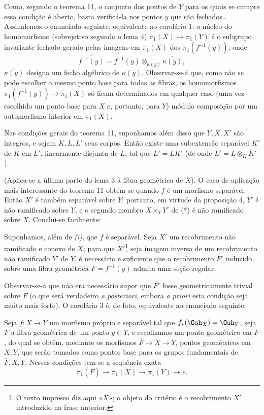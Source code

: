 Como, segundo o teorema 11, o conjunto dos pontos de $Y$ para os quais se
cumpre essa condição é aberto, basta verificá-la nos pontos $y$ que são
fechados\ldots{} Assinalemos o enunciado seguinte, equivalente ao corolário 1:
o núcleo do homomorfismo (sobrejetivo segundo o lema 4)
$\pi_1(X)\longrightarrow\pi_1(Y)$ é o subgrupo invariante fechado gerado
pelas imagens em $\pi_1(X)$ dos $\pi_1(\overline{f^{-1}(y)})$, onde
\[
  \overline{f^{-1}(y)}
  =f^{-1}(y)\otimes_{\kappa(y)}\overline{\kappa(y)},
\]
$\overline{\kappa(y)}$ designa um fecho algébrico de $\kappa(y)$. Observar-se-á
que, como não se pode escolher o mesmo ponto base para todas as fibras,
os homomorfismos $\pi_1(\overline{f^{-1}(y)})\longrightarrow\pi_1(X)$ só
ficam determinados em qualquer caso (uma vez escolhido um ponto base para $X$
e, portanto, para $Y$) módulo composição por um automorfismo interior em
$\pi_1(X)$.

 Nas condições gerais do teorema 11, suponhamos
além disso que $Y,X,X'$ são íntegros, e sejam $K,L,L'$ seus corpos. Então existe
uma subextensão separável $K'$ de $K$ em $L'$, linearmente disjunta de $L$, tal
que $L'=LK'$ (de onde $L'=L\otimes_K K'$).

(Aplica-se a última parte do lema 3 à fibra geométrica de $X$). O caso de
aplicação mais interessante do teorema 11 obtém-se quando $f$ é um morfismo
separável. Então $X'$ é também separável sobre $Y$; portanto, em virtude
da proposição 4, $Y'$ é não ramificado sobre $Y$, e o segundo membro
$X\times_Y Y'$ de (*) é não ramificado sobre $X$. Conclui-se facilmente:

 Suponhamos, além de \textit{(i)}, que $f$ é separável.
Seja $X'$ um recobrimento não ramificado e conexo de $X$; para que
$X'$\footnote{O texto impresso diz aqui «$X$»; o objeto do critério é o
recobrimento $X'$ introduzido na frase anterior.} seja imagem inversa de um
recobrimento não ramificado $Y'$ de $Y$, é necessário e suficiente que o
recobrimento $\overline F'$ induzido sobre uma fibra geométrica
$\overline F=f^{-1}(y)$ admita uma seção regular.

Observar-se-á que não era necessário supor que $\overline F'$ fosse
geometricamente trivial sobre $\overline F$ (o que será verdadeiro \textit{a
posteriori}, embora \textit{a priori} esta condição seja muito mais forte). O
corolário 3 é, de fato, equivalente ao enunciado seguinte:

 Seja $f:X\longrightarrow Y$ um morfismo próprio e separável
tal que $f_*(\Osh_X)=\Osh_Y$, seja $\overline F$ a fibra geométrica de um ponto
$y\in Y$, e escolhamos um ponto geométrico em $\overline F$, do qual se obtêm,
mediante os morfismos $\overline F\longrightarrow X\longrightarrow Y$, pontos
geométricos em $X,Y$, que serão tomados como pontos base para os grupos
fundamentais de $\overline F,X,Y$. Nessas condições tem-se a sequência
exata
\[
  \boxed{
    \pi_1(\overline F)\longrightarrow\pi_1(X)
    \longrightarrow\pi_1(Y)\longrightarrow e
  }.
\]

